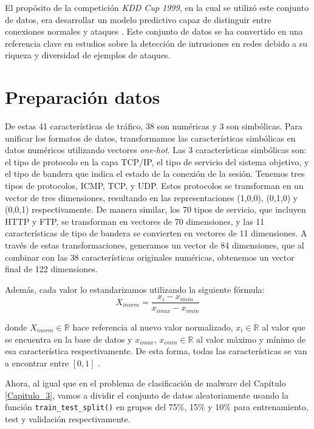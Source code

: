 El propósito de la competición \textit{KDD Cup 1999}, en la cual se utilizó este conjunto de datos, era desarrollar un modelo predictivo capaz de distinguir entre conexiones normales y ataques \citep{kddcup99}. Este conjunto de datos se ha convertido en una referencia clave en estudios sobre la detección de intrusiones en redes debido a su riqueza y diversidad de ejemplos de ataques.



\section{Preparación datos} \label{sec:datoskdd}

De estas 41 características de tráfico, 38 son numéricas y 3 son simbólicas. Para unificar los formatos de datos, transformamos las características simbólicas en datos numéricos utilizando vectores \emph{one-hot}. Las 3 características simbólicas son: el tipo de protocolo en la capa TCP/IP, el tipo de servicio del sistema objetivo, y el tipo de bandera que indica el estado de la conexión de la sesión. Tenemos tres tipos de protocolos, ICMP, TCP, y UDP. Estos protocolos se transforman en un vector de tres dimensiones, resultando en las representaciones (1,0,0), (0,1,0) y (0,0,1) respectivamente. De manera similar, los 70 tipos de servicio, que incluyen HTTP y FTP, se transforman en vectores de 70 dimensiones, y las 11 características de tipo de bandera se convierten en vectores de 11 dimensiones. A través de estas transformaciones, generamos un vector de 84 dimensiones, que al combinar con las 38 características originales numéricas, obtenemos un vector final de 122 dimensiones.

Además, cada valor lo estandarizamos utilizando la siguiente fórmula:
\begin{equation}
    X_{inorm} = \frac{x_i-x_{imin}}{x_{imax}-x_{imin}}
\end{equation}

donde $X_{inorm} \in \mathbb{R}$ hace referencia al nuevo valor normalizado, $x_i \in \mathbb{R}$ al valor que se encuentra en la base de datos y $x_{imax}$, $x_{imin} \in \mathbb{R}$ al valor máximo y mínimo de esa característica respectivamente. De esta forma, todas las características se van a encontrar entre $[0,1]$ \citep{kim2018encoding}.

Ahora, al igual que en el problema de clasificación de malware del Capítulo \ref{Capitulo_3},  vamos a dividir el conjunto de datos aleatoriamente usando la función \lstinline|train_test_split()| en grupos del 75\%, 15\% y 10\% para entrenamiento, test y validación respectivamente.


